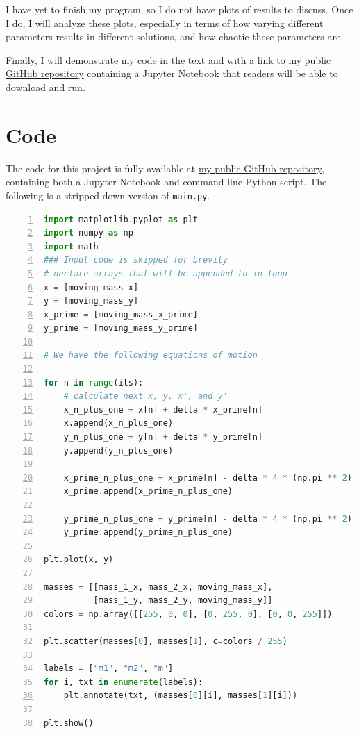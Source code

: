 \documentclass[preprint,titlepage,preprintnumbers,amsmath,amssymb,aps,11pt]{revtex4-2}
\begin{document}
\bigskip

I have yet to finish my program, so I do not have plots of results to discuss. Once I do, I will analyze these plots, especially in terms of how varying different parameters results in different solutions, and how chaotic these parameters are.

Finally, I will demonstrate my code in the text and with a link to \href{https://github.com/jasperswallen/PHYS304-Project}{my public GitHub repository}
containing a Jupyter Notebook that readers will be able to download and run.

\appendix
\section{Code}
The code for this project is fully available at \href{https://github.com/jasperswallen/PHYS304-Project}{my public GitHub repository},
containing both a Jupyter Notebook and command-line Python script. The following is a stripped down version of \texttt{main.py}.

\begin{lstlisting}[language=Python, numbers=left, breaklines=true]
import matplotlib.pyplot as plt
import numpy as np
import math
### Input code is skipped for brevity
# declare arrays that will be appended to in loop
x = [moving_mass_x]
y = [moving_mass_y]
x_prime = [moving_mass_x_prime]
y_prime = [moving_mass_y_prime]

# We have the following equations of motion

for n in range(its):
    # calculate next x, y, x', and y'
    x_n_plus_one = x[n] + delta * x_prime[n]
    x.append(x_n_plus_one)
    y_n_plus_one = y[n] + delta * y_prime[n]
    y.append(y_n_plus_one)

    x_prime_n_plus_one = x_prime[n] - delta * 4 * (np.pi ** 2) * (x[n + 1] / np.power((x[n + 1] ** 2) + (y[n + 1] ** 2), 3 / 2) + alpha * (x[n+1] - mass_2_x) / np.power((x[n + 1] - mass_2_x) ** 2 + y[n + 1] ** 2, 3 / 2))
    x_prime.append(x_prime_n_plus_one)

    y_prime_n_plus_one = y_prime[n] - delta * 4 * (np.pi ** 2) * y[n + 1] * (1 / np.power((x[n + 1] ** 2) + (y[n + 1] ** 2), 3 / 2) + 1 / np.power((x[n + 1] - mass_2_x) ** 2 + y[n + 1] ** 2, 3 / 2))
    y_prime.append(y_prime_n_plus_one)

plt.plot(x, y)

masses = [[mass_1_x, mass_2_x, moving_mass_x],
          [mass_1_y, mass_2_y, moving_mass_y]]
colors = np.array([[255, 0, 0], [0, 255, 0], [0, 0, 255]])

plt.scatter(masses[0], masses[1], c=colors / 255)

labels = ["m1", "m2", "m"]
for i, txt in enumerate(labels):
    plt.annotate(txt, (masses[0][i], masses[1][i]))

plt.show()

\end{lstlisting}


\end{document}
